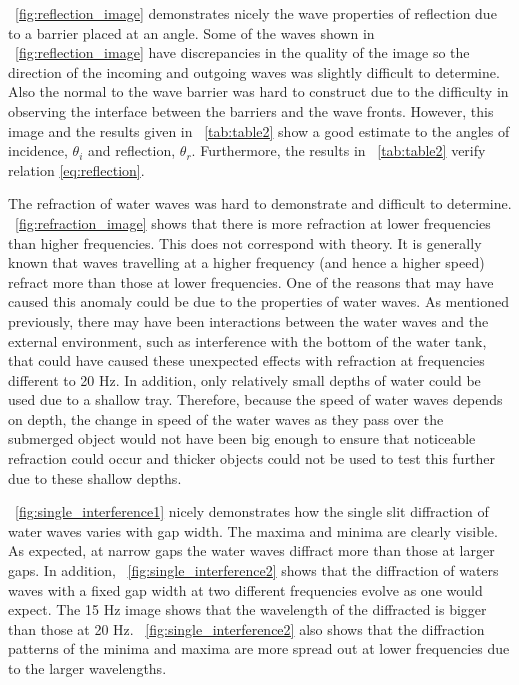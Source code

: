 \documentclass{article}
\newcommand{\figref}[2][\figurename~]{#1\ref{#2}}
\newcommand{\tabref}[2][\tablename~]{#1\ref{#2}}
\begin{document}
\vspace{2mm}
\noindent
\figref{fig:reflection_image} demonstrates nicely the wave properties of reflection due to a barrier placed at an angle. Some of the waves shown in \figref{fig:reflection_image} have discrepancies in the quality of the image so the direction of the incoming and outgoing waves was slightly difficult to determine. Also the normal to the wave barrier was hard to construct due to the difficulty in observing the interface between the barriers and the wave fronts. However, this image and the results given in \tabref{tab:table2} show a good estimate to the angles of incidence, $\theta_i$ and reflection, $\theta_r$. Furthermore, the results in \tabref{tab:table2} verify relation \eqref{eq:reflection}. 

\vspace{2mm}
\noindent
The refraction of water waves was hard to demonstrate and difficult to determine. \figref{fig:refraction_image} shows that there is more refraction at lower frequencies than higher frequencies. This does not correspond with theory. It is generally known that waves travelling at a higher frequency (and hence a higher speed) refract more than those at lower frequencies. One of the reasons that may have caused this anomaly could be due to the properties of water waves. As mentioned previously, there may have been interactions between the water waves and the external environment, such as interference with the bottom of the water tank, that could have caused these unexpected effects with refraction at frequencies different to 20 Hz. In addition, only relatively small depths of water could be used due to a shallow tray. Therefore, because the speed of water waves depends on depth, the change in speed of the water waves as they pass over the submerged object would not have been big enough to ensure that noticeable refraction could occur and thicker objects could not be used to test this further due to these shallow depths.

\vspace{2mm}
\noindent
\figref{fig:single_interference1} nicely demonstrates how the single slit diffraction of water waves varies with gap width. The maxima and minima are clearly visible. As expected, at narrow gaps the water waves diffract more than those at larger gaps. In addition, \figref{fig:single_interference2} shows that the diffraction of waters waves with a fixed gap width at two different frequencies evolve as one would expect. The 15 Hz image shows that the wavelength of the diffracted is bigger than those at 20 Hz. \figref{fig:single_interference2} also shows that the diffraction patterns of the minima and maxima are more spread out at lower frequencies due to the larger wavelengths.
\end{document}
